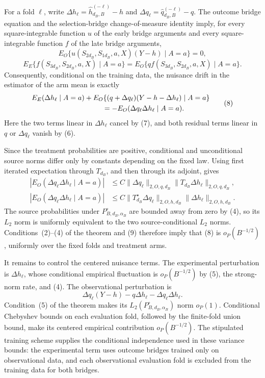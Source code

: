 For a fold \(\ell\), write \(\Delta h_\ell=\widehat h_{d_B,B}^{(-\ell)}-h\) and \(\Delta q_\ell=\widehat q_{d_B,B}^{(-\ell)}-q\).  The outcome bridge equation and the selection-bridge change-of-measure identity imply, for every square-integrable function \(u\) of the early bridge arguments and every square-integrable function \(f\) of the late bridge arguments,
\[
 E_O\{u(S_{2d_B},S_{1d_B},a,X)(Y-h)\mid A=a\}=0, \tag{6}
\]
\[
 E_E\{f(S_{3d_B},S_{2d_B},a,X)\mid A=a\}
 =E_O\{q f(S_{3d_B},S_{2d_B},a,X)\mid A=a\}. \tag{7}
\]
Consequently, conditional on the training data, the nuisance drift in the estimator of the arm mean is exactly
\[
\begin{aligned}
 &E_E(\Delta h_\ell\mid A=a)
 +E_O\{(q+\Delta q_\ell)(Y-h-\Delta h_\ell)\mid A=a\}\\
 &\hspace{35mm}=-E_O(\Delta q_\ell\Delta h_\ell\mid A=a).
\end{aligned} \tag{8}
\]
Here the two terms linear in \(\Delta h_\ell\) cancel by (7), and both residual terms linear in \(q\) or \(\Delta q_\ell\) vanish by (6).

Since the treatment probabilities are positive, conditional and unconditional source norms differ only by constants depending on the fixed law.  Using first iterated expectation through \(T_{d_B}\), and then through its adjoint, gives
\[
\begin{aligned}
 |E_O(\Delta q_\ell\Delta h_\ell\mid A=a)|
 &\le C\|\Delta q_\ell\|_{2,O,q,d_B}
       \|T_{d_B}\Delta h_\ell\|_{2,O,q,d_B},\\
 |E_O(\Delta q_\ell\Delta h_\ell\mid A=a)|
 &\le C\|T_{d_B}^{\star}\Delta q_\ell\|_{2,O,h,d_B}
       \|\Delta h_\ell\|_{2,O,h,d_B}.
\end{aligned} \tag{9}
\]
The source probabilities under \(P_{B,d_B,\alpha_B}^{\circ}\) are bounded away from zero by (4), so its \(L_2\) norm is uniformly equivalent to the two source-conditional \(L_2\) norms.  Conditions~(2)--(4) of the theorem and (9) therefore imply that (8) is \(o_P(B^{-1/2})\), uniformly over the fixed folds and treatment arms.

It remains to control the centered nuisance terms.  The experimental perturbation is \(\Delta h_\ell\), whose conditional empirical fluctuation is \(o_P(B^{-1/2})\) by (5), the strong-norm rate, and (4).  The observational perturbation is
\[
 \Delta q_\ell(Y-h)-q\Delta h_\ell-\Delta q_\ell\Delta h_\ell. \tag{10}
\]
Condition~(5) of the theorem makes its \(L_2(P_{B,d_B,\alpha_B}^{\circ})\) norm \(o_P(1)\).  Conditional Chebyshev bounds on each evaluation fold, followed by the finite-fold union bound, make its centered empirical contribution \(o_P(B^{-1/2})\).  The stipulated training scheme supplies the conditional independence used in these variance bounds: the experimental term uses outcome bridges trained only on observational data, and each observational evaluation fold is excluded from the training data for both bridges.

